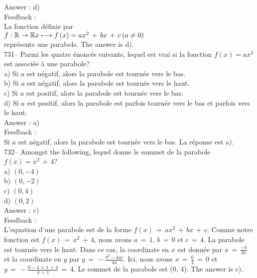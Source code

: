 \documentclass[letterpaper, 12pt]{article}
\begin{document}
Answer : d)\\

Feedback : \\
La fonction d\'efinie par\\
$f :\mathbb{R}\rightarrow\mathbb{R}\\
x\longmapsto f\left( x\right) =ax^{2}\,+\,bx\,+\,c \left( a\neq 0 \right)$
\\
repr\'esente une parabole.  The answer is d).\\

731-- Parmi les quatre \'enonc\'es suivants, lequel est vrai si la fonction
$f(x)=ax^{2}$ est associ\'ee \`a une parabole?\\
a) Si $a$ est n\'egatif, alors la parabole est tourn\'ee vers le bas.\\
b) Si $a$ est n\'egatif, alors la parabole est tourn\'ee vers le haut.  \\
c) Si $a$ est positif, alors la parabole est tourn\'ee vers le bas.\\
d) Si $a$ est positif, alors la parabole est parfois tourn\'ee vers le bas
et parfois vers le haut.\\

Answer : a)\\

Feedback : \\
Si $a$ est n\'egatif, alors la parabole est tourn\'ee vers le bas.  La
r\'eponse est a).\\

732-- Amongst the following, lequel donne le sommet de la parabole
$f\left( x\right) =x^{2}\,+\,4$?\\
a) $(0,-4)$\\
b) $(0,-2)$\\
c) $(0,4)$\\
d) $(0,2)$\\

Answer : c)\\

Feedback : \\
L'equation d'une parabole est de la forme
$f(x)\,=\,ax^2\,+\,bx\,+\,c$. Comme notre fonction est
$f(x)\,=\,x^2\,+\,4$, nous avons $a\,=\,1$, $b\,=\,0$ et $c\,=\,4$.
La parabole est tourn\'ee vers le haut. Dans ce cas, la coordinate
en $x$ est donn\'ee par $x\,=\, \frac{-b}{2a}$ et la coordinate en
$y$ par $y\,=\, -\frac{b^2-4ac}{4a}$. Ici, nous avons
$x\,=\,\frac{0}{4}\,=\,0$ et
$y\,=\,-\frac{0-4\,\times\,1\,\times\,4}{4\,\times\,1}\,=\,4$. Le
sommet de la parabole est (0, 4). The answer is c).
\end{document}
